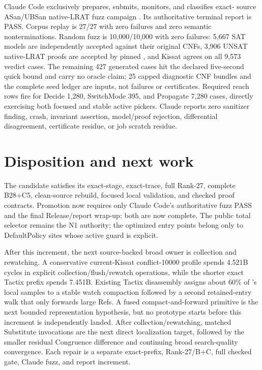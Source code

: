 \documentclass[11pt]{article}
\newcommand{\code}[1]{\texttt{\detokenize{#1}}}
\begin{document}
Claude Code exclusively prepares, submits, monitors, and classifies exact-
source ASan/UBSan native-LRAT fuzz campaign \code{1647657}.  Its authoritative
terminal report is PASS.  Corpus replay is 27/27 with zero failures and zero
semantic nonterminations.  Random fuzz is 10,000/10,000 with zero failures:
5,667 SAT models are independently accepted against their original CNFs,
3,906 UNSAT native-LRAT proofs are accepted by pinned \code{lrat-check}, and
Kissat agrees on all 9,573 verdict cases.  The remaining 427 generated cases
hit the declared five-second quick bound and carry no oracle claim; 25 capped
diagnostic CNF bundles and the complete seed ledger are inputs, not failures or
certificates.  Required reach rows fire for Decide 1,280, SwitchMode 395, and
Propagate 7,280 cases, directly exercising both focused and stable active
pickers.  Claude reports zero sanitizer finding, crash, invariant assertion,
model/proof rejection, differential disagreement, certificate residue, or job
scratch residue.

\section{Disposition and next work}
The candidate satisfies its exact-stage, exact-trace, full Rank-27, complete
B28+C5, clean-source rebuild, focused local validation, and checked proof
contracts.  Promotion now requires only Claude Code's authoritative fuzz PASS
and the final Release/report wrap-up; both are now complete.  The public total
selector remains the N1
authority; the optimized entry points belong only to DefaultPolicy sites whose
active guard is explicit.

After this increment, the next source-backed broad owner is collection and
rewatching.  A conservative current-Kissat conflict-10000 profile spends
4.521B cycles in explicit collection/flush/rewatch operations, while the
shorter exact Tactix prefix spends 7.451B.  Existing Tactix disassembly assigns
about 60\% of \code{kernel_collect_garbage}'s local samples to a stable watch
compaction followed by a second retained-entry walk that only forwards large
Refs.  A fused compact-and-forward primitive is the next bounded representation
hypothesis, but no prototype starts before this increment is independently
landed.  After collection/rewatching, matched Substitute invocations are the
next direct localization target, followed by the smaller residual Congruence
difference and continuing broad search-quality convergence.  Each repair is a
separate exact-prefix, Rank-27/B+C, full checked gate, Claude fuzz, and report
increment.
\end{document}
